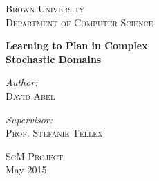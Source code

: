 \documentclass[11pt]{article}
\begin{document}
\begin{titlepage}
\begin{center}
\vfill
\textsc{\Large Brown University \\ Department of Computer Science}\\[1.5cm]

\vspace{55mm}

{ \huge \bfseries Learning to Plan in Complex  \\Stochastic Domains \\[0.9cm] }

\noindent
\begin{minipage}[t]{0.4\textwidth}
\begin{flushleft} \large
\emph{Author:}\\
\textsc{David Abel}
\end{flushleft}
\end{minipage}%
\begin{minipage}[t]{0.4\textwidth}
\begin{flushright} \large
\emph{Supervisor:} \\
\textsc{Prof. Stefanie Tellex}
\end{flushright}
\end{minipage}


\vspace{20mm}
\textsc{\Large ScM Project}\\[0.5cm]

\vfill
{\large May 2015}

\end{center}
\end{titlepage}

\newpage
\end{document}
